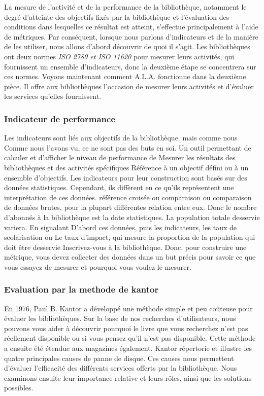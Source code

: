 \documentclass[french,a4paper,12pt]{article}
\begin{document}
\quad La mesure de l'activité et de la performance de la bibliothèque, notamment le degré d'atteinte des objectifs fixés par la bibliothèque et l'évaluation des conditions dans lesquelles ce résultat est atteint, s'effectue principalement à l'aide de métriques. Par conséquent, lorsque nous parlons d'indicateurs et de la manière de les utiliser, nous allons d'abord découvrir de quoi il s'agit. Les bibliothèques ont deux normes \textit{ISO 2789 et ISO 11620} pour mesurer leurs activités, qui fournissent un ensemble d'indicateurs, donc la deuxième étape se concentrera sur ces normes. Voyons maintenant comment A.L.A. fonctionne dans la deuxième pièce. Il offre aux bibliothèques l'occasion de mesurer leurs activités et d'évaluer les services qu'elles fournissent. 

\subsubsection{Indicateur de performance } 

\quad Les indicateurs sont liés aux objectifs de la bibliothèque. mais comme nous Comme nous l'avons vu, ce ne sont pas des buts en soi. Un outil permettant de calculer et d'afficher le niveau de performance de Mesurer les résultats des bibliothèques et des activités spécifiques Référence à un objectif défini ou à un ensemble d'objectifs. Les indicateurs pour leur construction sont basés sur des données statistiques. Cependant, ils diffèrent en ce qu'ils représentent une interprétation de ces données. 
référence croisée ou comparaison ou comparaison de données brutes, pour la plupart différentes relation entre eux. Donc le nombre d'abonnés à la bibliothèque est la date statistiques. La population totale desservie variera. En signalant D'abord ces données, puis les indicateurs, les taux de scolarisation ou Le taux d'impact, qui mesure la proportion de la population qui doit être desservie 
Inscrivez-vous à la bibliothèque. Donc, pour construire une métrique, vous devez collecter des données dans un but précis pour savoir ce que vous essayez de mesurer et pourquoi vous voulez le mesurer. 
 
 \subsubsection{Evaluation par la methode de kantor}

\quad En 1976, Paul B. Kantor a développé une méthode simple et peu coûteuse pour évaluer les bibliothèques. Sur la base de nos recherches d'utilisateurs, nous pouvons vous aider à découvrir pourquoi le livre que vous recherchez n'est pas réellement disponible ou si vous pensez qu'il n'est pas disponible. Cette méthode a ensuite été étendue aux magazines également. Kantor répertorie et illustre les quatre principales causes de panne de disque. Ces causes nous permettent d'évaluer l'efficacité des différents services offerts par la bibliothèque. Nous examinons ensuite leur importance relative et leurs rôles, ainsi que les solutions possibles.
\end{document}
